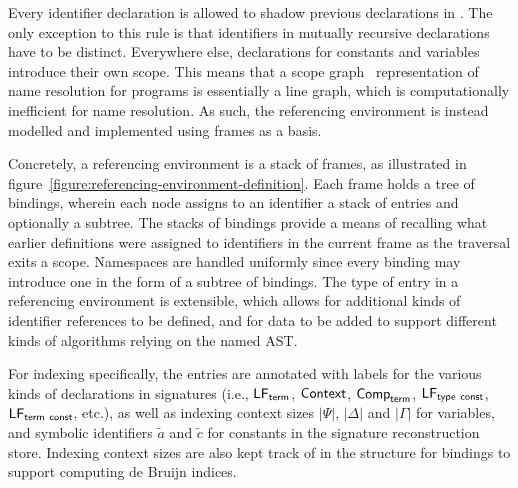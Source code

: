 
Every identifier declaration is allowed to shadow previous declarations in \Beluga.
The only exception to this rule is that identifiers in mutually recursive declarations have to be distinct.
Everywhere else, declarations for constants and variables introduce their own scope.
This means that a scope graph~\cite{nameresolution} representation of name resolution for \Beluga programs is essentially a line graph, which is computationally inefficient for name resolution.
As such, the referencing environment is instead modelled and implemented using frames as a basis.

Concretely, a referencing environment is a stack of frames, as illustrated in figure~\ref{figure:referencing-environment-definition}.
Each frame holds a tree of bindings, wherein each node assigns to an identifier a stack of entries and optionally a subtree.
The stacks of bindings provide a means of recalling what earlier definitions were assigned to identifiers in the current frame as the traversal exits a scope.
Namespaces are handled uniformly since every binding may introduce one in the form of a subtree of bindings.
The type of entry in a referencing environment is extensible, which allows for additional kinds of identifier references to be defined, and for data to be added to support different kinds of algorithms relying on the named \ac{AST}.

For indexing specifically, the entries are annotated with labels for the various kinds of declarations in \Beluga signatures (i.e., $\mathsf{LF}_{\mathsf{term}}$, $\mathsf{Context}$, $\mathsf{Comp}_{\mathsf{term}}$, $\mathsf{LF}_{\mathsf{type\ const}}$, $\mathsf{LF}_{\mathsf{term\ const}}$, etc.), as well as indexing context sizes $|\Psi|$, $|\Delta|$ and $|\Gamma|$ for variables, and symbolic identifiers $\tilde a$ and $\tilde c$ for constants in the signature reconstruction store.
Indexing context sizes are also kept track of in the structure for bindings to support computing de Bruijn indices.

